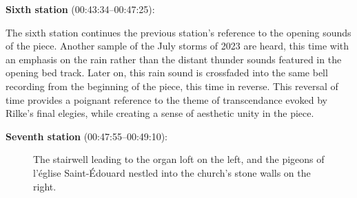 \documentclass[12pt,twoside,maitrise]{dms_ks}
\theoremstyle{definition}
\begin{document}
{\textbf{Sixth station} (00:43:34--00:47:25):


The sixth station continues the previous station's reference to the opening sounds of the piece. 
Another sample of the July storms of 2023 are heard, this time with an emphasis on the rain rather than the distant thunder sounds featured in the opening bed track. 
Later on, this rain sound is crossfaded into the same bell recording from the beginning of the piece, this time in reverse. 
This reversal of time provides a poignant reference to the theme of transcendance evoked by Rilke's final elegies, while creating a sense of aesthetic unity in the piece.

\textbf{Seventh station} (00:47:55--00:49:10):

\begin{figure}[h]
    \centering
    \caption{The stairwell leading to the organ loft on the left, and the pigeons of l'église Saint-Édouard nestled into the church's stone walls on the right.}
    \label{fig:sidebyside}
\end{figure}

}
\end{document}
